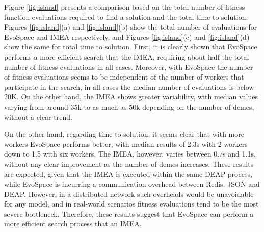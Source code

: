 Figure \ref{fig:island} presents a comparison based on the total number of fitness function evaluations required to find a solution
and the total time to solution.
Figures \ref{fig:island}(a) and \ref{fig:island}(b) show the total number of evaluations for EvoSpace and IMEA respectively,
and Figures \ref{fig:island}(c) and \ref{fig:island}(d)  show the same for total time to solution.
First, it is clearly shown that EvoSpace performs a more efficient search that the IMEA, requiring about half the total number of fitness evaluations 
in all cases. Moreover, with EvoSpace the number of fitness evaluations seems to be independent of the number of workers that participate in the search, in all cases the median number of evaluations is below 20K.
On the other hand, the IMEA shows greater variability, with median values varying from around 35k to as much as 50k depending on the number of
demes, without a clear trend.

On the other hand, regarding time to solution, it seems clear that with more workers EvoSpace performs better, with median results of 2.3s with 2 workers down to 1.5 with six workers.
The IMEA, however, varies between 0.7s and 1.1s, without any clear improvement as the number of demes increases.
These results are expected, given that the IMEA is executed within the same DEAP process, while EvoSpace is incurring a communication overhead between Redis, JSON and DEAP.
However, in a distributed network such overheads would be unavoidable for any model, and in real-world scenarios fitness evaluations tend to be the most severe bottleneck.
Therefore, these results suggest that EvoSpace can perform a more efficient search process that an IMEA.


